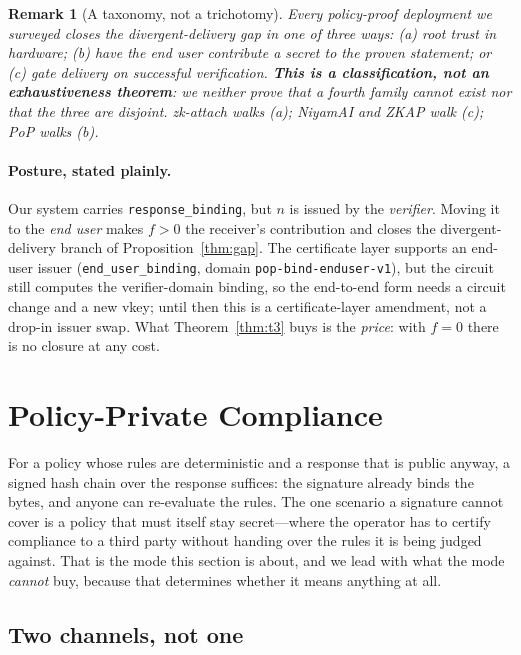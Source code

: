 \documentclass[10pt,journal,compsoc]{IEEEtran}
\newtheorem{remark}[theorem]{Remark}
\begin{document}
\begin{remark}[A taxonomy, not a trichotomy]
\label{rem:taxonomy}
Every policy-proof deployment we surveyed closes the divergent-delivery gap in
one of three ways: (a) root trust in hardware; (b) have the \emph{end user}
contribute a secret to the proven statement; or (c) gate delivery on successful
verification. \textbf{This is a classification, not an exhaustiveness theorem}:
we neither prove that a fourth family cannot exist nor that the three are
disjoint. zk-attach \cite{zkattach} walks (a); NiyamAI and ZKAP walk (c); PoP
walks (b).
\end{remark}

\paragraph{Posture, stated plainly.} Our system carries
\texttt{response\_binding}, but $n$ is issued by the \emph{verifier}. Moving it
to the \emph{end user} makes $f > 0$ the receiver's contribution and closes the
divergent-delivery branch of Proposition~\ref{thm:gap}. The certificate layer
supports an end-user issuer (\texttt{end\_user\_binding}, domain
\texttt{pop-bind-enduser-v1}), but the circuit still computes the verifier-domain
binding, so the end-to-end form needs a circuit change and a new vkey; until then
this is a certificate-layer amendment, not a drop-in issuer swap. What
Theorem~\ref{thm:t3} buys is the \emph{price}: with $f = 0$ there is no closure
at any cost.

\section{Policy-Private Compliance}
\label{sec:private-policy}

For a policy whose rules are deterministic and a response that is public
anyway, a signed hash chain over the response suffices: the signature already
binds the bytes, and anyone can re-evaluate the rules. The one scenario a
signature cannot cover is a policy that must itself stay secret---where the
operator has to certify compliance to a third party without handing over the
rules it is being judged against. That is the mode this section is about, and we
lead with what the mode \emph{cannot} buy, because that determines whether it
means anything at all.

\subsection{Two channels, not one}
\label{sec:wp4-finding}
\end{document}
